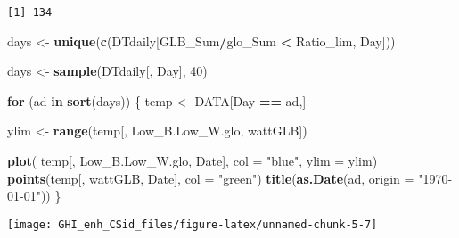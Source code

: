 \documentclass[
  10pt,
  a4paper,oneside]{article}
\newenvironment{Shaded}{\begin{snugshade}}{\end{snugshade}}
\newcommand{\AttributeTok}[1]{\textcolor[rgb]{0.13,0.29,0.53}{#1}}
\newcommand{\ControlFlowTok}[1]{\textcolor[rgb]{0.13,0.29,0.53}{\textbf{#1}}}
\newcommand{\DecValTok}[1]{\textcolor[rgb]{0.00,0.00,0.81}{#1}}
\newcommand{\FloatTok}[1]{\textcolor[rgb]{0.00,0.00,0.81}{#1}}
\newcommand{\FunctionTok}[1]{\textcolor[rgb]{0.13,0.29,0.53}{\textbf{#1}}}
\newcommand{\NormalTok}[1]{#1}
\newcommand{\OtherTok}[1]{\textcolor[rgb]{0.56,0.35,0.01}{#1}}
\newcommand{\SpecialCharTok}[1]{\textcolor[rgb]{0.81,0.36,0.00}{\textbf{#1}}}
\newcommand{\StringTok}[1]{\textcolor[rgb]{0.31,0.60,0.02}{#1}}
\begin{document}
\begin{Shaded}
\end{Shaded}

\begin{verbatim}
[1] 134
\end{verbatim}

\begin{Shaded}
\begin{Highlighting}[]
\NormalTok{days }\OtherTok{\textless{}{-}} \FunctionTok{unique}\NormalTok{(}\FunctionTok{c}\NormalTok{(DTdaily[GLB\_Sum}\SpecialCharTok{/}\NormalTok{glo\_Sum }\SpecialCharTok{\textless{}}\NormalTok{ Ratio\_lim, Day]))}

\NormalTok{days }\OtherTok{\textless{}{-}} \FunctionTok{sample}\NormalTok{(DTdaily[, Day], }\DecValTok{40}\NormalTok{)}

\ControlFlowTok{for}\NormalTok{ (ad }\ControlFlowTok{in} \FunctionTok{sort}\NormalTok{(days)) \{}
\NormalTok{  temp }\OtherTok{\textless{}{-}}\NormalTok{ DATA[Day }\SpecialCharTok{==}\NormalTok{ ad,]}

\NormalTok{  ylim }\OtherTok{\textless{}{-}} \FunctionTok{range}\NormalTok{(temp[, Low\_B.Low\_W.glo, wattGLB])}

  \FunctionTok{plot}\NormalTok{(  temp[, Low\_B.Low\_W.glo, Date],}
         \AttributeTok{col =} \StringTok{"blue"}\NormalTok{,}
         \AttributeTok{ylim =}\NormalTok{ ylim)}
  \FunctionTok{points}\NormalTok{(temp[, wattGLB, Date], }\AttributeTok{col =} \StringTok{"green"}\NormalTok{)}
  \FunctionTok{title}\NormalTok{(}\FunctionTok{as.Date}\NormalTok{(ad, }\AttributeTok{origin =} \StringTok{"1970{-}01{-}01"}\NormalTok{))}
\NormalTok{\}}
\end{Highlighting}
\end{Shaded}

\begin{center}\texttt{[image: GHI\_enh\_CSid\_files/figure-latex/unnamed-chunk-5-7]} \end{center}
\end{document}
